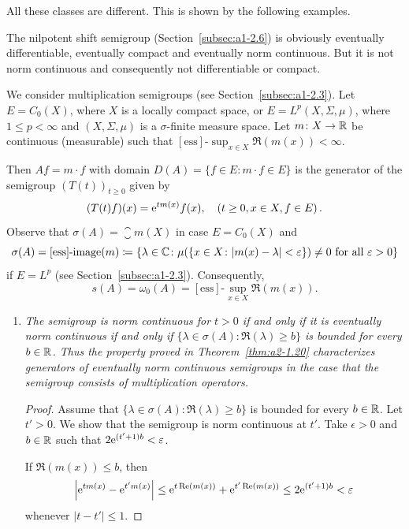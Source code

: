 All these classes are different.
This is shown by the following examples.
\begin{example}\label{ex:a2-1.27}
The nilpotent shift semigroup (Section~\ref{subsec:a1-2.6}) is obviously eventually differentiable, eventually compact and eventually norm continuous.
But it is not norm continuous and consequently not differentiable or compact.
\end{example}
\begin{example}\label{ex:a2-1.28}
We consider multiplication semigroups (see Section~\ref{subsec:a1-2.3}).
Let $E = C_{0}(X)$, where $X$ is a locally compact space, or $E = L^{p}(X,\Sigma,\mu)$, where $1 \leq p < \infty$ and $(X,\Sigma,\mu)$ is a $\sigma$-finite measure space.
Let $m \colon X \to \mathbb{R}$ be continuous (\resp measurable) such that $[\text{ess}]\text{-}\sup_{x \in X} \Re(m(x)) < \infty$.

Then $Af = m \cdot f$ with domain $D(A) = \{f \in E \colon m \cdot f \in E\}$ is the generator of the semigroup $(T(t))_{t \geq 0}$ given by
\[
    (T(t)f)(x) = \eu^{tm(x)}f(x), \quad (t \geq 0, x \in X, f \in E )\, .
\]
Observe that $\sigma(A) = \closure{m(X)}$ in case $E = C_{0}(X)$ and 
\[
\sigma(A) = [\text{ess}]\text{-}\text{image}(m) \coloneq \{\lambda \in \C \colon \mu(\{x \in X \colon |m(x)-\lambda| < \epsilon\}) \neq 0 \text{ for all } \epsilon > 0\} 
\]
if\/ $E = L^{p}$ (see Section~\ref{subsec:a1-2.3}).
Consequently, 
%
\[
	s(A) = \omega_{0}(A) = [\text{ess}]\text{-}\sup_{x \in X} \Re(m(x)).
\]
%
\begin{enumerate}[\upshape (i), wide, labelindent=.25em]
\item \label{ex:a2-1.28-1}
\textit{The semigroup is norm continuous for $t > 0$ if and only if it is eventually norm continuous if and only if 
$\{\lambda \in \sigma(A) \colon \Re(\lambda) \geq b\}$ 
is bounded for every $b \in \mathbb{R}$.
Thus the property proved in Theorem~\ref{thm:a2-1.20}   characterizes generators of eventually norm continuous semigroups in the case that the semigroup consists of multiplication operators.}
\begin{proof}
Assume that $\{\lambda \in \sigma(A) \colon \Re(\lambda) \geq b\}$ is bounded for every $b \in \mathbb{R}$.
Let $t' > 0$.
We show that the semigroup is norm continuous at $t'$.
Take $\epsilon > 0$ and $b \in \mathbb{R}$ such that $2\eu^{(t'+1)b} < \epsilon$.

If\/ $\Re(m(x)) \leq b$, then
\[
    \left|\eu^{tm(x)} - \eu^{t'm(x)}\right| \leq \eu^{t\Re(m(x))} + \eu^{t'\Re(m(x))} \leq 2\eu^{(t'+1)b} < \epsilon
\]
whenever $|t-t'| \leq 1$.


\end{proof}
\end{enumerate}
\end{example}
